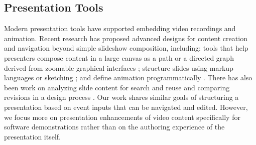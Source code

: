 
\subsection{Presentation Tools}
Modern presentation tools have supported embedding video recordings and animation. Recent research has proposed advanced designs for content creation and navigation beyond simple slideshow composition, including: tools that help presenters compose content in a large canvas \cite{Good:2002:ZUI:941231.941236} as a path \cite{Lichtschlag:2009:FTA:1518701.1518786} or a directed graph \cite{Spicer:2012:NAD:2379790.2379795} derived from zoomable graphical interfaces \cite{Bederson:1994:PZG:192426.192435}; structure slides using markup languages \cite{Edge:2013:HDP:2470654.2470749} or sketching \cite{Li:2003:SIP:958432.958476}; and define animation programmatically \cite{Zongker:2003:CAP:846276.846319}. There has also been work on analyzing slide content for search and reuse \cite{Bergman:2010:OWP:1719970.1719999,Sharmin:2012:SCC:2166966.2166992} and comparing revisions in a design process \cite{Drucker:2006:CMM:1166253.1166263}. Our work shares similar goals of structuring a presentation based on event inputs that can be navigated and edited. However, we focus more on presentation enhancements of video content specifically for software demonstrations rather than on the authoring experience of the presentation itself.

